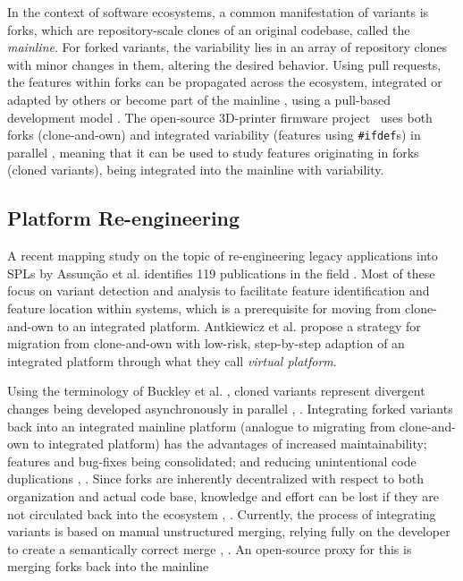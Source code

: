 In the context of software ecosystems, a common manifestation of variants is forks, which are repository-scale clones of an original codebase, called the \textit{mainline}. For forked variants, the variability lies in an array of repository clones with minor changes in them, altering the desired behavior. Using pull requests, the features within forks can be propagated across the ecosystem, integrated or adapted by others or become part of the mainline \cite{stanciulescu2015}, using a pull-based development model \cite{gousios2014pullreq}. The open-source 3D-printer firmware project \marlin~uses both forks (clone-and-own) and integrated variability (features using \texttt{\#ifdef}s) in parallel \cite{stanciulescu2015}, meaning that it can be used to study features originating in forks (cloned variants), being integrated into the mainline with variability.

\subsection{Platform Re-engineering}
A recent mapping study on the topic of re-engineering legacy applications into SPLs by Assun{\c{c}}{\~a}o et al. identifies 119 publications in the field \cite{assuncao2017mapping}. Most of these focus on variant detection and analysis to facilitate feature identification and feature location within systems, which is a prerequisite for moving from clone-and-own to an integrated platform. Antkiewicz et al. \cite{antkiewicz2014flexible} propose a strategy for migration from clone-and-own with low-risk, step-by-step adaption of an integrated platform through what they call \textit{virtual platform}. 

Using the terminology of Buckley et al. \cite{buckley2005}, cloned variants represent divergent changes being developed asynchronously in parallel \cite{mens2002}, \cite{stanciulescu2015}. Integrating forked variants back into an integrated mainline platform (analogue to migrating from clone-and-own to integrated platform) has the advantages of increased maintainability; features and bug-fixes being consolidated; and reducing unintentional code duplications \cite{schmorleiz2016similarity}, \cite{stanciulescu2015}. Since forks are inherently decentralized with respect to both organization and actual code base, knowledge and effort can be lost if they are not circulated back into the ecosystem \cite{stanciulescu2015}, \cite{gousios2015}.
Currently, the process of integrating variants is based on manual unstructured merging, relying fully on the developer to create a semantically correct merge \cite{mens2002}, \cite{apel2011}. An open-source proxy for this is merging forks back into the mainline 

